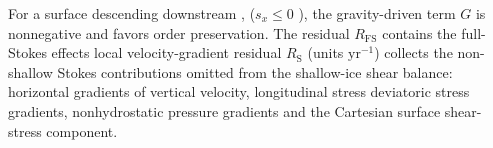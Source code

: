 \documentclass[review]{igs}
\providecommand{\DIFadd}[1]{{\protect\color{blue} \sf #1}} %
\providecommand{\DIFdel}[1]{{\protect\color{red} \scriptsize #1}} %
\providecommand{\DIFaddbegin}{} %
\providecommand{\DIFaddend}{} %
\providecommand{\DIFdelbegin}{} %
\providecommand{\DIFdelend}{} %
\newcommand{\DIFscaledelfig}{0.5}
\newlength{\DIFdelgraphicswidth} %
\newlength{\DIFdelgraphicsheight} %
\newcommand{\DIFaddincludegraphics}[2][]{{\color{blue}\fbox{\DIFOincludegraphics[#1]{#2}}}} %
\newcommand{\DIFdelincludegraphics}[2][]{%
\sbox{\DIFdelgraphicsbox}{\DIFOincludegraphics[#1]{#2}}%
\settoboxwidth{\DIFdelgraphicswidth}{\DIFdelgraphicsbox} %
\settoboxtotalheight{\DIFdelgraphicsheight}{\DIFdelgraphicsbox} %
\scalebox{\DIFscaledelfig}{%
\parbox[b]{\DIFdelgraphicswidth}{\usebox{\DIFdelgraphicsbox}\\[-\baselineskip] \rule{\DIFdelgraphicswidth}{0em}}\llap{\resizebox{\DIFdelgraphicswidth}{\DIFdelgraphicsheight}{%
\setlength{\unitlength}{\DIFdelgraphicswidth}%
\begin{picture}(1,1)%
\thicklines\linethickness{2pt} %
{\color[rgb]{1,0,0}\put(0,0){\framebox(1,1){}}}%
{\color[rgb]{1,0,0}\put(0,0){\line( 1,1){1}}}%
{\color[rgb]{1,0,0}\put(0,1){\line(1,-1){1}}}%
\end{picture}%
}\hspace*{3pt}}} %
} %
\DeclareRobustCommand{\DIFaddbegin}{\DIFOaddbegin \let\includegraphics\DIFaddincludegraphics} %
\DeclareRobustCommand{\DIFaddend}{\DIFOaddend \let\includegraphics\DIFOincludegraphics} %
\DeclareRobustCommand{\DIFdelbegin}{\DIFOdelbegin \let\includegraphics\DIFdelincludegraphics} %
\DeclareRobustCommand{\DIFdelend}{\DIFOaddend \let\includegraphics\DIFOincludegraphics} %
\begin{document}
\DIFaddend For a surface descending downstream \DIFdelbegin \DIFdel{, }\DIFdelend \DIFaddbegin \DIFadd{(}\DIFaddend \(s_x\leq0\)\DIFaddbegin \DIFadd{)}\DIFaddend , the gravity-driven term \(G\) is nonnegative and favors order preservation. The \DIFdelbegin \DIFdel{residual \(R_{\mathrm{FS}}\) contains the full-Stokes effects }\DIFdelend \DIFaddbegin \DIFadd{local velocity-gradient residual \(R_{\mathrm{S}}\) (units \(\mathrm{yr^{-1}}\)) collects the non-shallow Stokes contributions }\DIFaddend omitted from the shallow-ice shear balance: \DIFaddbegin \DIFadd{horizontal }\DIFaddend gradients of vertical velocity, longitudinal \DIFdelbegin \DIFdel{stress}\DIFdelend \DIFaddbegin \DIFadd{deviatoric stress gradients}\DIFaddend , nonhydrostatic pressure \DIFaddbegin \DIFadd{gradients }\DIFaddend and the Cartesian surface shear-stress component.
\end{document}
